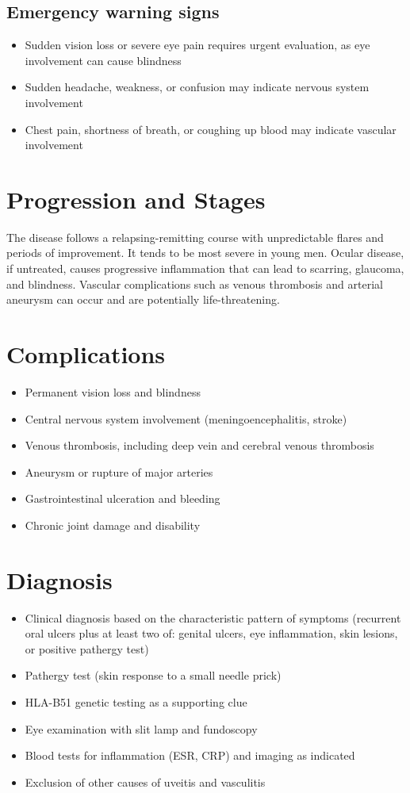 \subsection{Emergency warning signs}
\begin{itemize}[noitemsep]
  \item Sudden vision loss or severe eye pain requires urgent evaluation, as eye involvement can cause blindness
  \item Sudden headache, weakness, or confusion may indicate nervous system involvement
  \item Chest pain, shortness of breath, or coughing up blood may indicate vascular involvement
\end{itemize}
\section{Progression and Stages}
The disease follows a relapsing-remitting course with unpredictable flares and periods of improvement. It tends to be most severe in young men. Ocular disease, if untreated, causes progressive inflammation that can lead to scarring, glaucoma, and blindness. Vascular complications such as venous thrombosis and arterial aneurysm can occur and are potentially life-threatening.
\section{Complications}
\begin{itemize}[noitemsep]
  \item Permanent vision loss and blindness
  \item Central nervous system involvement (meningoencephalitis, stroke)
  \item Venous thrombosis, including deep vein and cerebral venous thrombosis
  \item Aneurysm or rupture of major arteries
  \item Gastrointestinal ulceration and bleeding
  \item Chronic joint damage and disability
\end{itemize}
\section{Diagnosis}
\begin{itemize}[noitemsep]
  \item Clinical diagnosis based on the characteristic pattern of symptoms (recurrent oral ulcers plus at least two of: genital ulcers, eye inflammation, skin lesions, or positive pathergy test)
  \item Pathergy test (skin response to a small needle prick)
  \item HLA-B51 genetic testing as a supporting clue
  \item Eye examination with slit lamp and fundoscopy
  \item Blood tests for inflammation (ESR, CRP) and imaging as indicated
  \item Exclusion of other causes of uveitis and vasculitis
\end{itemize}
